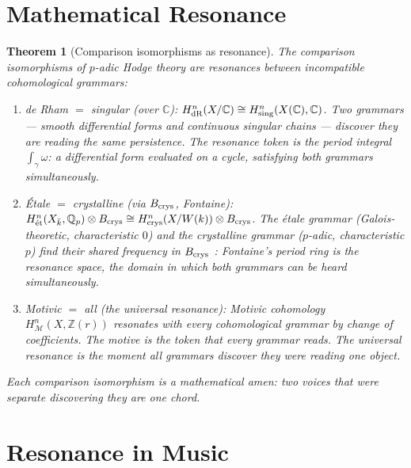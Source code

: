 \documentclass[12pt]{article}
\newtheorem{theorem}{Theorem}
\theoremstyle{definition}
\theoremstyle{remark}
\begin{document}
\section{Mathematical Resonance}

\begin{theorem}[Comparison isomorphisms as resonance]
\label{thm:comparison}
The comparison isomorphisms of $p$-adic Hodge theory
are resonances between incompatible cohomological grammars:

\begin{enumerate}
\item \emph{de Rham $=$ singular} (over $\mathbb{C}$):
  $H^n_{\rm dR}(X/\mathbb{C}) \cong H^n_{\rm sing}(X(\mathbb{C}), \mathbb{C})$.
  Two grammars --- smooth differential forms and continuous singular chains ---
  discover they are reading the same persistence.
  The resonance token is the period integral $\int_\gamma \omega$:
  a differential form evaluated on a cycle,
  satisfying both grammars simultaneously.

\item \emph{\'Etale $=$ crystalline} (via $B_{\rm crys}$, Fontaine):
  $H^n_{\rm \acute{e}t}(X_{\bar{k}}, \mathbb{Q}_p) \otimes B_{\rm crys}
  \cong H^n_{\rm crys}(X/W(k)) \otimes B_{\rm crys}$.
  The \'etale grammar (Galois-theoretic, characteristic $0$)
  and the crystalline grammar ($p$-adic, characteristic $p$)
  find their shared frequency in $B_{\rm crys}$ \cite{perfectoid}:
  Fontaine's period ring is the resonance space,
  the domain in which both grammars can be heard simultaneously.

\item \emph{Motivic $=$ all} (the universal resonance):
  Motivic cohomology $H^n_{\mathcal{M}}(X, \mathbb{Z}(r))$ \cite{motives}
  resonates with every cohomological grammar by change of coefficients.
  The motive is the token that every grammar reads.
  The universal resonance is the moment all grammars
  discover they were reading one object.
\end{enumerate}
Each comparison isomorphism is a mathematical amen:
two voices that were separate discovering they are one chord.
\end{theorem}

\section{Resonance in Music}
\end{document}
